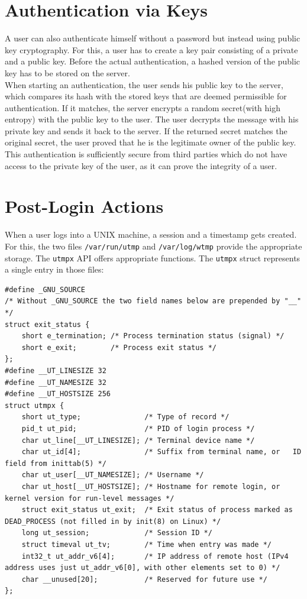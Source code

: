 \documentclass[10pt,a4paper,titlepage,twoside,english,final]{zhawreprt}
\begin{document}
\section{Authentication via Keys}\label{sec:AuthViaKeys}
A user can also authenticate himself without a password but instead using public key cryptography. For this, a user has to create a key pair consisting of a private and a public key. Before the actual authentication, a hashed version of the public key has to be stored on the server.\\
When starting an authentication, the user sends his public key to the server, which compares its hash with the stored keys that are deemed permissible for authentication. If it matches, the server encrypts a random secret(with high entropy) with the public key to the user. The user decrypts the message with his private key and sends it back to the server. If the returned secret matches the original secret, the user proved that he is the legitimate owner of the public key.\\
This authentication is sufficiently secure from third parties which do not have access to the private key of the user, as it can prove the integrity of a user.

\section{Post-Login Actions}\label{sec:PostLoginActions}
When a user logs into a \gls{UNIX} machine, a session and a timestamp gets created.\\
For this, the two files \texttt{/var/run/utmp} and \texttt{/var/log/wtmp} provide the appropriate storage. The \texttt{utmpx} \gls{API} offers appropriate functions. The \texttt{utmpx} struct represents a single entry in those files:
\setlistingC
\begin{lstlisting}[caption={Definition of the utmpx structure {\citep[p.819]{KerriskTLPI}}},label=lst:UtmpxDefinition]
#define _GNU_SOURCE
/* Without _GNU_SOURCE the two field names below are prepended by "__" */
struct exit_status {
	short e_termination; /* Process termination status (signal) */
	short e_exit; 		 /* Process exit status */
};
#define __UT_LINESIZE 32
#define __UT_NAMESIZE 32
#define __UT_HOSTSIZE 256
struct utmpx {
	short ut_type; 				 /* Type of record */
	pid_t ut_pid; 				 /* PID of login process */
	char ut_line[__UT_LINESIZE]; /* Terminal device name */
	char ut_id[4]; 				 /* Suffix from terminal name, or	ID field from inittab(5) */
	char ut_user[__UT_NAMESIZE]; /* Username */
	char ut_host[__UT_HOSTSIZE]; /* Hostname for remote login, or kernel version for run-level messages */
	struct exit_status ut_exit;  /* Exit status of process marked as DEAD_PROCESS (not filled in by init(8) on Linux) */
	long ut_session; 			 /* Session ID */
	struct timeval ut_tv; 		 /* Time when entry was made */
	int32_t ut_addr_v6[4]; 		 /* IP address of remote host (IPv4 address uses just ut_addr_v6[0], with other elements set to 0) */
	char __unused[20]; 			 /* Reserved for future use */
};
\end{lstlisting}
\end{document}
